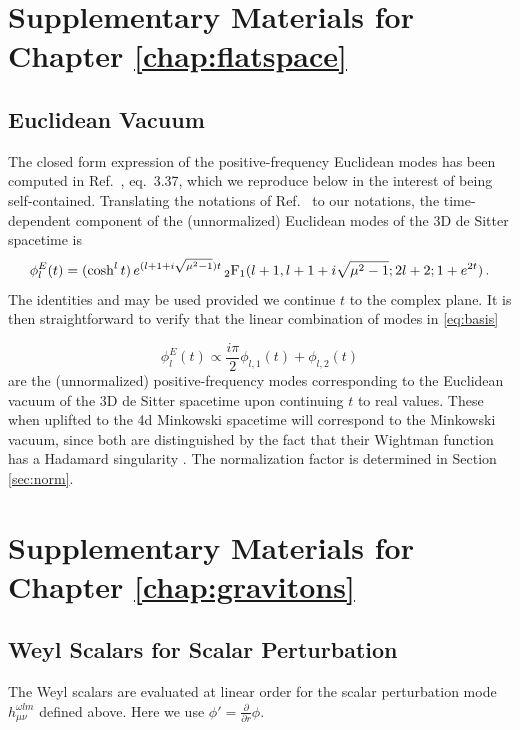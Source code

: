 \documentclass{brownthesis}
\begin{document}
\chapter{Supplementary Materials for Chapter \ref{chap:flatspace}}\label{app:euclidean}
\section{Euclidean Vacuum}

The closed form expression of the positive-frequency
Euclidean modes has been computed in Ref.~\cite{Bousso:2001mw},
eq.~3.37, which we reproduce below in the interest of being self-contained.
Translating the notations of Ref.~\cite{Bousso:2001mw} to our notations,
the time-dependent component of the (unnormalized) Euclidean modes
of the 3D de Sitter spacetime is
\begin{equation}
\phi_{l}^{E}(t)=(\cosh^{l}t)\,e^{(l+1+i\sqrt{\mu^{2}-1})t}\,{}_{2}{\rm F}_{1}(l+1,l+1+i\sqrt{\mu^{2}-1};2l+2;1+e^{2t})\,.\label{eq:evacmode}
\end{equation}
 The identities \cite{pident} and \cite{qident} may be used provided
we continue $t$ to the complex plane. It is then straightforward
to verify that the linear combination of modes in \eqref{eq:basis}

\[
\phi_{l}^{E}(t)\propto\frac{i\pi}{2}\phi_{l,1}(t)+\phi_{l,2}(t)
\]
are the (unnormalized) positive-frequency modes corresponding to the
Euclidean vacuum of the 3D de Sitter spacetime upon continuing $t$
to real values. These when uplifted to the 4d Minkowski spacetime
will correspond to the Minkowski vacuum, since both are distinguished
by the fact that their Wightman function has a Hadamard singularity
\cite{cmp/1103904566}. The normalization factor is determined in
Section \ref{sec:norm}.

\chapter{Supplementary Materials for Chapter \ref{chap:gravitons}}
\section{Weyl Scalars for Scalar Perturbation}

The Weyl scalars are evaluated at linear order for the scalar perturbation
mode $h_{\mu\nu}^{\omega lm}$ defined above. Here we use $\phi'=\frac{\partial}{\partial r}\phi$.
\end{document}
